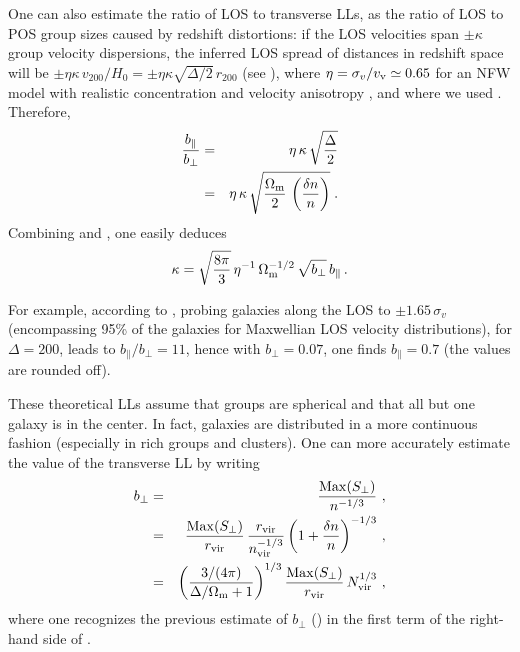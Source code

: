 One can also estimate the ratio of LOS to transverse LLs, as the ratio of LOS
to POS group sizes caused by redshift distortions: if the LOS velocities span
$\pm \kappa$ group velocity dispersions, the inferred LOS spread of distances
in redshift space will be $\pm \eta \kappa\, v_{200} / H_0 = \pm \eta \kappa
\sqrt{\Delta/2}\,r_{200}$ (see \citealp{MBM+10}), where  $\eta = \sigma_v/v_{\rm
v} \simeq 0.65$ for an NFW model with realistic concentration and velocity
anisotropy \citep{MBB13}, and where we used .
Therefore,
%
\begin{eqnarray}
    {b_\parallel\over b_\perp} &=&
    \eta \,\kappa\, \sqrt{\Delta \over
        2}
    \label{eq:LLratiofromDelta}\\
    &=&
    \eta \,\kappa\, \sqrt{{\Omega_{\rm m}\over
        2}\,\left({\delta n\over n}\right)} \;.
    \label{eq:bparfromkappa}
\end{eqnarray}
%
Combining  and
, one easily deduces
%
\begin{equation}
    \kappa = \sqrt{8\pi\over 3}\,\eta^{-1}\,\Omega_{\rm m}^{-1/2}\,
    \sqrt{b_\perp}\,b_\parallel \,.
    \label{eq:kappafromlls}
\end{equation}

For example, according to , probing galaxies
along the LOS to $\pm1.65\,\sigma_v$ (encompassing 95\% of the galaxies for
Maxwellian LOS velocity distributions), for $\Delta = 200$, leads to
$b_\parallel/b_\perp=11$, hence with $b_\perp=0.07$, one finds
$b_\parallel=0.7$ (the values are rounded off).

These theoretical LLs assume that groups are spherical and that all but one
galaxy is in the center. In fact,  galaxies are distributed in a more
continuous fashion (especially in rich groups and clusters).
%
One can more accurately estimate the value of the transverse LL by writing
%
\begin{eqnarray}
    b_\perp &=& {{\rm Max}(S_\perp)\over  n^{-1/3}}
    \ ,
      \nonumber \\
    &=& {{\rm Max}(S_\perp)\over r_{{\rm vir}}}\,
    {r_{{\rm vir}}\over  n_{\rm vir}^{-1/3}}\,
    {\left(1+{\delta n\over n}\right)}^{-1/3}
     \ , \nonumber \\
    &=& {\left({3/(4\pi)\over \Delta/\Omega_{\rm m}+1}\right)}^{1/3}\,
    {{\rm Max}(S_\perp)\over
        r_{{\rm vir}}}\,N_{\rm vir}^{1/3} \ ,
    \label{eq:bperppred2}
\end{eqnarray}
%
where one recognizes the previous estimate of $b_\perp$
() in the first term of the right-hand side of
.

